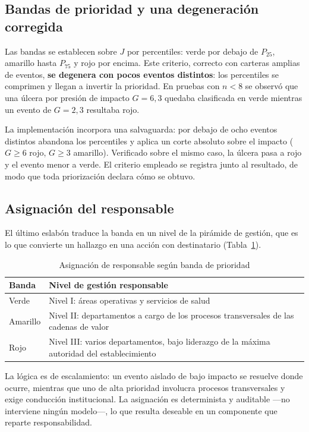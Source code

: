 \documentclass[conference]{IEEEtran}
\begin{document}
\subsection{Bandas de prioridad y una degeneración corregida}
Las bandas se establecen sobre $J$ por percentiles: verde por debajo de $P_{25}$,
amarillo hasta $P_{75}$ y rojo por encima. Este criterio, correcto con
carteras amplias de eventos, \textbf{se degenera con pocos eventos distintos}:
los percentiles se comprimen y llegan a invertir la prioridad. En pruebas con
$n < 8$ se observó que una úlcera por presión de impacto $G = 6{,}3$ quedaba
clasificada en verde mientras un evento de $G = 2{,}3$ resultaba rojo.

La implementación incorpora una salvaguarda: por debajo de ocho eventos
distintos abandona los percentiles y aplica un corte absoluto sobre el impacto
($G \geq 6$ rojo, $G \geq 3$ amarillo). Verificado sobre el mismo caso, la
úlcera pasa a rojo y el evento menor a verde. El criterio empleado se registra
junto al resultado, de modo que toda priorización declara cómo se obtuvo.

\subsection{Asignación del responsable}
El último eslabón traduce la banda en un nivel de la pirámide de gestión, que
es lo que convierte un hallazgo en una acción con destinatario
(Tabla~\ref{tab:responsable}).

\begin{table}[htbp]
\caption{Asignación de responsable según banda de prioridad}
\label{tab:responsable}
\centering
\footnotesize
\begin{tabular}{@{}lp{}@{}}
\toprule
\textbf{Banda} & \textbf{Nivel de gestión responsable} \\
\midrule
Verde & Nivel I: áreas operativas y servicios de salud \\
Amarillo & Nivel II: departamentos a cargo de los procesos transversales de las cadenas de valor \\
Rojo & Nivel III: varios departamentos, bajo liderazgo de la máxima autoridad del establecimiento \\
\bottomrule
\end{tabular}
\end{table}

La lógica es de escalamiento: un evento aislado de bajo impacto se resuelve
donde ocurre, mientras que uno de alta prioridad involucra procesos
transversales y exige conducción institucional. La asignación es determinista y
auditable ---no interviene ningún modelo---, lo que resulta deseable en un
componente que reparte responsabilidad.
\end{document}

